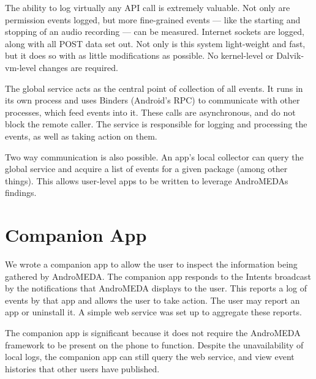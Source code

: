 The ability to log virtually any API call is extremely valuable. Not only are permission events logged, but more fine-grained events --- like the starting and stopping of an audio recording --- can be measured. Internet sockets are logged, along with all POST data set out. Not only is this system light-weight and fast, but it does so with as little modifications as possible. No kernel-level or Dalvik-vm-level changes are required.

The global service acts as the central point of collection of all events. It runs in its own process and uses Binders (Android's RPC) to communicate with other processes, which feed events into it. These calls are asynchronous, and do not block the remote caller. The service is responsible for logging and processing the events, as well as taking action on them.

Two way communication is also possible. An app's local collector can query the global service and acquire a list of events for a given package (among other things). This allows user-level apps to be written to leverage AndroMEDAs findings.

\section{Companion App}
We wrote a companion app to allow the user to inspect the information being gathered by AndroMEDA. The companion app responds to the Intents broadcast by the notifications that AndroMEDA displays to the user. This reports a log of events by that app and allows the user to take action. The user may report an app or uninstall it. A simple web service was set up to aggregate these reports.

The companion app is significant because it does not require the AndroMEDA framework to be present on the phone to function. Despite the unavailability of local logs, the companion app can still query the web service, and view event histories that other users have published.
